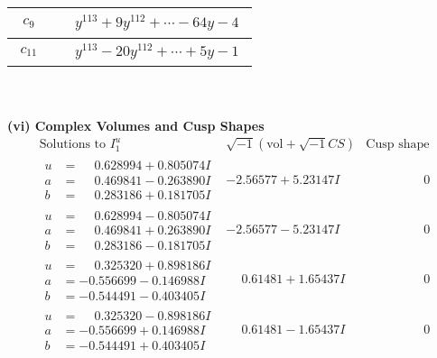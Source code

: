 \documentclass[1p]{elsarticle_modified}
\theoremstyle{definition}
\newcommand{\I}{\sqrt{-1}}
\begin{document}
\begin{tabular}{m{50pt}|m{274pt}}
\hline $$\begin{aligned}c_{9}\end{aligned}$$&$\begin{aligned}
&y^{113}+9 y^{112}+\cdots-64 y-4
\end{aligned}$\\
\hline $$\begin{aligned}c_{11}\end{aligned}$$&$\begin{aligned}
&y^{113}-20 y^{112}+\cdots+5 y-1
\end{aligned}$\\
\hline
\end{tabular}\\~\\
\newpage\flushleft \textbf{(vi) Complex Volumes and Cusp Shapes}
$$\begin{array}{c|c|c}  
\text{Solutions to }I^u_{1}& \I (\text{vol} + \sqrt{-1}CS) & \text{Cusp shape}\\
 \hline 
\begin{aligned}
u &= \phantom{-}0.628994 + 0.805074 I \\
a &= \phantom{-}0.469841 - 0.263890 I \\
b &= \phantom{-}0.283186 + 0.181705 I\end{aligned}
 & -2.56577 + 5.23147 I & \phantom{-0.000000 } 0 \\ \hline\begin{aligned}
u &= \phantom{-}0.628994 - 0.805074 I \\
a &= \phantom{-}0.469841 + 0.263890 I \\
b &= \phantom{-}0.283186 - 0.181705 I\end{aligned}
 & -2.56577 - 5.23147 I & \phantom{-0.000000 } 0 \\ \hline\begin{aligned}
u &= \phantom{-}0.325320 + 0.898186 I \\
a &= -0.556699 - 0.146988 I \\
b &= -0.544491 - 0.403405 I\end{aligned}
 & \phantom{-}0.61481 + 1.65437 I & \phantom{-0.000000 } 0 \\ \hline\begin{aligned}
u &= \phantom{-}0.325320 - 0.898186 I \\
a &= -0.556699 + 0.146988 I \\
b &= -0.544491 + 0.403405 I\end{aligned}
 & \phantom{-}0.61481 - 1.65437 I & \phantom{-0.000000 } 0 \\ \hline\begin{aligned}

\end{aligned}
\end{array}$$
\end{document}
